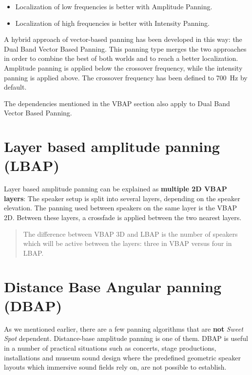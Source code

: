 \documentclass[
  letterpaper,
  DIV=11,
  numbers=noendperiod]{scrreport}
\providecommand{\tightlist}{%
  \setlength{\itemsep}{0pt}\setlength{\parskip}{0pt}}\usepackage{longtable,booktabs,array}
\begin{document}
\begin{itemize}
\tightlist
\item
  Localization of low frequencies is better with Amplitude Panning.
\item
  Localization of high frequencies is better with Intensity Panning.
\end{itemize}

A hybrid approach of vector-based panning has been developed in this
way: the Dual Band Vector Based Panning. This panning type merges the
two approaches in order to combine the best of both worlds and to reach
a better localization. Amplitude panning is applied below the crossover
frequency, while the intensity panning is applied above. The crossover
frequency has been defined to 700~Hz by default.

The dependencies mentioned in the VBAP section also apply to Dual Band
Vector Based Panning.

\hypertarget{layer-based-amplitude-panning-lbap}{%
\section{Layer based amplitude panning
(LBAP)}\label{layer-based-amplitude-panning-lbap}}

Layer based amplitude panning can be explained as \textbf{multiple 2D
VBAP layers}: The speaker setup is split into several layers, depending
on the speaker elevation. The panning used between speakers on the same
layer is the VBAP 2D. Between these layers, a crossfade is applied
between the two nearest layers.

\begin{quote}
The difference between VBAP 3D and LBAP is the number of speakers which
will be active between the layers: three in VBAP versus four in LBAP.
\end{quote}

\hypertarget{distance-base-angular-panning-dbap}{%
\section{Distance Base Angular panning
(DBAP)}\label{distance-base-angular-panning-dbap}}

As we mentioned earlier, there are a few panning algorithms that are
\textbf{not} \emph{Sweet Spot} dependent. Distance-base amplitude
panning is one of them. DBAP is useful in a number of practical
situations such as concerts, stage productions, installations and museum
sound design where the predefined geometric speaker layouts which
immersive sound fields rely on, are not possible to establish.
\end{document}
